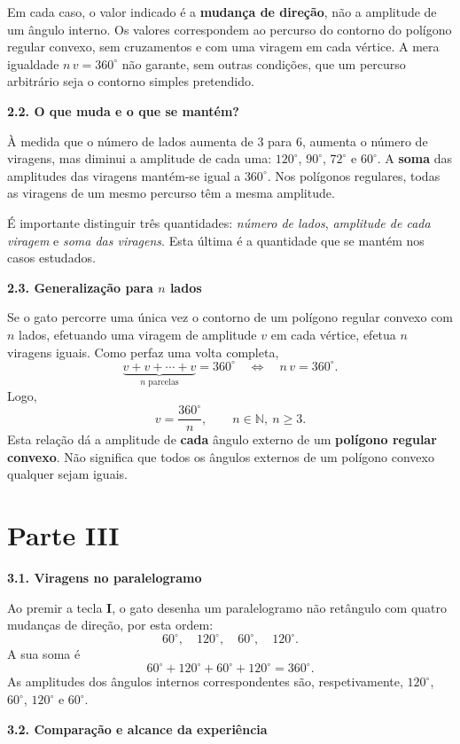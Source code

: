 Em cada caso, o valor indicado é a \textbf{mudança de direção},
não a amplitude de um ângulo interno. Os valores correspondem ao
percurso do contorno do polígono regular convexo, sem cruzamentos e
com uma viragem em cada vértice. A mera igualdade
$n\,v=360^\circ$ não garante, sem outras condições, que um
percurso arbitrário seja o contorno simples pretendido.

\noindent\textbf{2.2. O que muda e o que se mantém?}

À medida que o número de lados aumenta de $3$ para $6$, aumenta o
número de viragens, mas diminui a amplitude de cada uma: $120^\circ$,
$90^\circ$, $72^\circ$ e $60^\circ$. A \textbf{soma} das amplitudes das
viragens mantém-se igual a $360^\circ$. Nos polígonos regulares,
todas as viragens de um mesmo percurso têm a mesma amplitude.

É importante distinguir três quantidades: \emph{número de lados},
\emph{amplitude de cada viragem} e \emph{soma das viragens}. Esta
última é a quantidade que se mantém nos casos estudados.

\noindent\textbf{2.3. Generalização para $n$ lados}

Se o gato percorre uma única vez o contorno de um polígono regular
convexo com $n$ lados, efetuando uma viragem de amplitude $v$ em cada
vértice, efetua $n$ viragens iguais. Como perfaz uma volta completa,
\[
\underbrace{v+v+\cdots+v}_{n\text{ parcelas}}=360^\circ
\quad\Longleftrightarrow\quad
n\,v=360^\circ.
\]
Logo,
\[
\boxed{v=\frac{360^\circ}{n}},\qquad n\in\mathbb{N},\ n\geq3.
\]
Esta relação dá a amplitude de \textbf{cada} ângulo externo de um
\textbf{polígono regular convexo}. Não significa que todos os ângulos
externos de um polígono convexo qualquer sejam iguais.

\section*{Parte III}

\noindent\textbf{3.1. Viragens no paralelogramo}

Ao premir a tecla \textbf{I}, o gato desenha um paralelogramo não
retângulo com quatro mudanças de direção, por esta ordem:
\[
60^\circ,\quad120^\circ,\quad60^\circ,\quad120^\circ.
\]
A sua soma é
\[
60^\circ+120^\circ+60^\circ+120^\circ=\boxed{360^\circ}.
\]
As amplitudes dos ângulos internos correspondentes são,
respetivamente, $120^\circ$, $60^\circ$, $120^\circ$ e $60^\circ$.

\noindent\textbf{3.2. Comparação e alcance da experiência}

